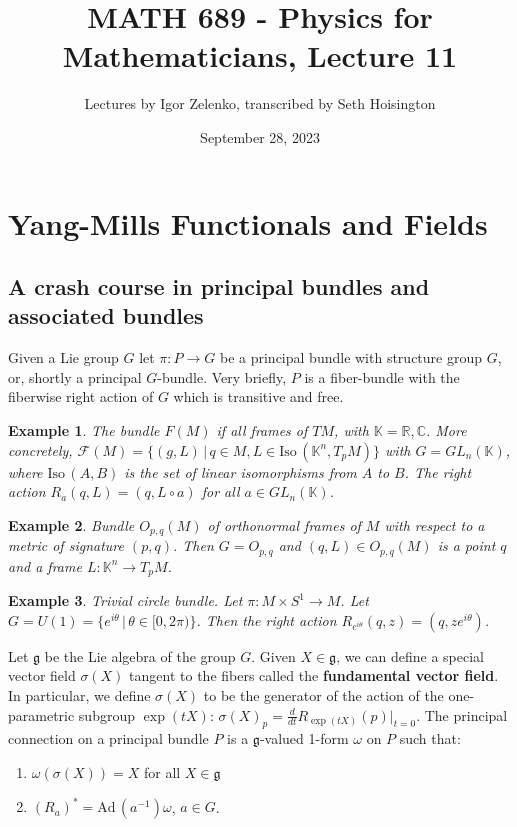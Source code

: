 \documentclass{article}
\title{MATH 689 - Physics for Mathematicians, Lecture 11}
\author{Lectures by Igor Zelenko, transcribed by Seth Hoisington}
\date{September 28, 2023}
\newcommand{\R}{\mathbb R}
\newcommand{\C}{\mathbb C}
\newcommand{\nl}{\newline\newline\noindent}
\newcommand{\w}{\omega}
\newtheorem{ex}{Example}
\begin{document}
\maketitle

\section{Yang-Mills Functionals and Fields}
\subsection{A crash course in principal bundles and associated bundles}
Given a Lie group $G$ let $\pi:P\to G$ be a principal bundle with structure group $G$, or, shortly a principal $G$-bundle. Very briefly, $P$ is a fiber-bundle with the fiberwise right action of $G$ which is transitive and free.
\begin{ex}
    The bundle $F(M)$ if all frames of $TM$, with $\mathbb K = \R,\C$. More concretely, $\mathcal F(M) = \{(g,L)\,|\, q\in M, L\in \text{Iso}\,(\mathbb K^n,T_pM)\}$ with $G = GL_n(\mathbb K)$, where $\text{Iso}\,(A,B)$ is the set of linear isomorphisms from $A$ to $B$. The right action $R_a(q,L) = (q,L\circ a)$ for all $a\in GL_n(\mathbb K)$.
\end{ex}
\begin{ex}
    Bundle $O_{p,q}(M)$ of orthonormal frames of $M$ with respect to a metric of signature $(p,q)$. Then $G = O_{p,q}$ and $(q,L)\in O_{p,q}(M)$ is a point $q$ and a frame $L:\mathbb K^n\to T_pM$.
\end{ex}
\begin{ex}
    Trivial circle bundle. Let $\pi:M\times S^1\to M$. Let $G = U(1) = \{e^{i\theta}\,|\, \theta\in [0,2\pi) \}$. Then the right action $R_{e^{i\theta}}(q,z) = (q, ze^{i\theta})$.
\end{ex}
Let $\mathfrak g$ be the Lie algebra of the group $G$. Given $X\in \mathfrak g$, we can define a special vector field $\sigma(X)$ tangent to the fibers called the \textbf{fundamental vector field}. In particular, we define $\sigma(X)$ to be the generator of the action of the one-parametric subgroup $\exp(tX)$: $\sigma(X)_p = \frac{d}{dt}R_{\exp(tX)}(p)\big|_{t=0}$.
\nl
The principal connection on a principal bundle $P$ is a $\mathfrak g$-valued 1-form $\w$ on $P$ such that:
\begin{enumerate}
    \item $\w(\sigma(X)) = X$ for all $X\in \mathfrak g$
    \item $(R_a)^* = \text{Ad}\,(a^{-1})\w$, $a\in G$.
\end{enumerate}
\end{document}
